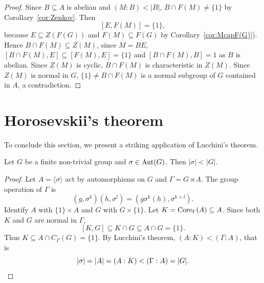 \begin{proof}
	\medskip
	Since $B\subseteq A$ is abelian and $(M:B)<|B|$, $B\cap F(M)\ne\{1\}$ by Corollary~\ref{cor:Zenkov}. Then 
 \[
 [E,F(M)]=\{1\},
 \]
 because $E\subseteq
	Z(F(G))$ and $F(M)\subseteq F(G)$ by Corollary~\ref{cor:McapF(G)}).
	Hence $B\cap F(M)\subseteq Z(M)$, since $M=BE$, $[B\cap F(M),E]\subseteq
	[F(M),E]=\{1\}$ and $[B\cap F(M),B]=1$ as $B$ is abelian. Since 
	$Z(M)$ is cyclic, $B\cap F(M)$ is characteristic in $Z(M)$. Since 
	$Z(M)$ is normal in $G$, $\{1\}\ne B\cap F(M)$ is a normal subgroup of $G$
	contained in $A$, a contradiction. 
\end{proof}

\section{Horosevskii's theorem}

To conclude this section, we present a striking application of Lucchini's theorem.

\begin{corollary}[Horosevskii]
	Let $G$ be a finite non-trivial group and $\sigma\in\operatorname{Aut}(G)$. Then 
	$|\sigma|<|G|$.
\end{corollary}

\begin{proof}
	Let $A=\langle\sigma\rangle$ act by automorphisms on $G$ and 
	 $\Gamma=G\rtimes A$. The group operation of $\Gamma$ is 
	\[
	(g,\sigma^k)(h,\sigma^l)=(g\sigma^k(h),\sigma^{k+l}).
	\]
	Identify $A$ with $\{1\}\times A$ and $G$ with $G\times\{1\}$.
    Let $K=\operatorname{Core}_\Gamma(A)\subseteq A$. 
    Since both $K$ and $G$ are normal in $\Gamma$, 
    \[ 
    [K,G]\subseteq K\cap G\subseteq A\cap G=\{1\}.
    \]
    Thus  
    $K\subseteq A\cap C_\Gamma(G)=\{1\}$.
    By Lucchini's theorem, 
    $(A:K)<(\Gamma:A)$, that is
	\[
		|\sigma|=|A|=(A:K)<(\Gamma:A)=|G|.\qedhere
	\]
\end{proof}
